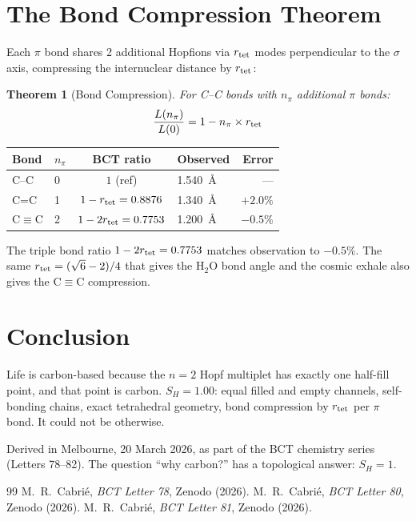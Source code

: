 \documentclass[aps,prl,twocolumn,showpacs,superscriptaddress]{revtex4-2}
\newtheorem{theorem}{Theorem}
\begin{document}
\section{The Bond Compression Theorem}

Each $\pi$ bond shares 2 additional Hopfions via $r_{\rm tet}$ 
modes perpendicular to the $\sigma$ axis, compressing the 
internuclear distance by $r_{\rm tet}$:

\begin{theorem}[Bond Compression]
For C--C bonds with $n_\pi$ additional $\pi$ bonds:
\begin{equation}
    \frac{L(n_\pi)}{L(0)} = 1 - n_\pi \times r_{\rm tet}
\end{equation}
\end{theorem}

\begin{center}
\begin{tabular}{llclr}
\toprule
Bond & $n_\pi$ & BCT ratio & Observed & Error \\
\midrule
C--C & 0 & $1$ (ref) & 1.540~\AA & --- \\
C=C  & 1 & $1-r_{\rm tet} = 0.8876$ & 1.340~\AA & $+2.0\%$ \\
C$\equiv$C & 2 & $1-2r_{\rm tet} = 0.7753$ & 1.200~\AA & $-0.5\%$ \\
\bottomrule
\end{tabular}
\end{center}

The triple bond ratio $1-2r_{\rm tet} = 0.7753$ matches observation 
to $-0.5\%$. The same $r_{\rm tet}=(\sqrt{6}-2)/4$ that gives the 
H$_2$O bond angle and the cosmic exhale also gives the C$\equiv$C 
compression.

\section{Conclusion}

Life is carbon-based because the $n=2$ Hopf multiplet has exactly 
one half-fill point, and that point is carbon. $S_H = 1.00$: equal 
filled and empty channels, self-bonding chains, exact tetrahedral 
geometry, bond compression by $r_{\rm tet}$ per $\pi$ bond. It 
could not be otherwise.

\begin{acknowledgments}
Derived in Melbourne, 20 March 2026, as part of the BCT chemistry 
series (Letters 78--82). The question ``why carbon?'' has a 
topological answer: $S_H = 1$.
\end{acknowledgments}

\begin{thebibliography}{99}
 M.~R.~Cabri\'e, \textit{BCT Letter 78}, Zenodo (2026).
 M.~R.~Cabri\'e, \textit{BCT Letter 80}, Zenodo (2026).
 M.~R.~Cabri\'e, \textit{BCT Letter 81}, Zenodo (2026).
\end{thebibliography}
\end{document}
